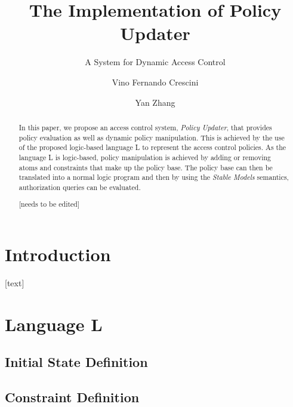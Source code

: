\documentclass{llncs}
\begin{document}
  \long{}

  \title{The Implementation of Policy Updater}
  \subtitle{A System for Dynamic Access Control}

  \author{Vino Fernando Crescini \and Yan Zhang}


  \maketitle

  \begin{abstract}
    In this paper, we propose an access control system, \emph{Policy Updater},
    that provides policy evaluation as well as dynamic policy manipulation.
    This is achieved by the use of the proposed logic-based language L to
    represent the access control policies. As the language L is logic-based,
    policy manipulation is achieved by adding or removing atoms and constraints
    that make up the policy base. The policy base can then be translated into a
    normal logic program and then by using the \emph{Stable Models} semantics,
    authorization queries can be evaluated.

    [needs to be edited]
  \end{abstract}

  \section{Introduction}
    [text]

  \newpage
  \section{Language L}

    \subsection{Initial State Definition}

    \subsection{Constraint Definition}
\end{document}
